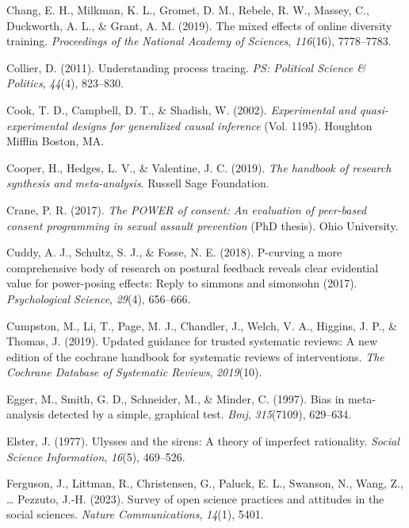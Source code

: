 \documentclass[
  ,jou]{apa6}
\newlength{\cslhangindent}
\newenvironment{CSLReferences}[2] %
 {\begin{list}{}{%
  \setlength{\itemindent}{0pt}
  \setlength{\leftmargin}{0pt}
  \setlength{\parsep}{0pt}
  \ifodd #1
   \setlength{\leftmargin}{\cslhangindent}
   \setlength{\itemindent}{-1\cslhangindent}
  \fi
  \setlength{\itemsep}{#2\baselineskip}}}
 {\end{list}}
\begin{document}
\begin{CSLReferences}{1}{0}
Chang, E. H., Milkman, K. L., Gromet, D. M., Rebele, R. W., Massey, C., Duckworth, A. L., \& Grant, A. M. (2019). The mixed effects of online diversity training. \emph{Proceedings of the National Academy of Sciences}, \emph{116}(16), 7778--7783.

Collier, D. (2011). Understanding process tracing. \emph{PS: Political Science \& Politics}, \emph{44}(4), 823--830.

Cook, T. D., Campbell, D. T., \& Shadish, W. (2002). \emph{Experimental and quasi-experimental designs for generalized causal inference} (Vol. 1195). Houghton Mifflin Boston, MA.

Cooper, H., Hedges, L. V., \& Valentine, J. C. (2019). \emph{The handbook of research synthesis and meta-analysis}. Russell Sage Foundation.

Crane, P. R. (2017). \emph{The POWER of consent: An evaluation of peer-based consent programming in sexual assault prevention} (PhD thesis). Ohio University.

Cuddy, A. J., Schultz, S. J., \& Fosse, N. E. (2018). P-curving a more comprehensive body of research on postural feedback reveals clear evidential value for power-posing effects: Reply to simmons and simonsohn (2017). \emph{Psychological Science}, \emph{29}(4), 656--666.

Cumpston, M., Li, T., Page, M. J., Chandler, J., Welch, V. A., Higgins, J. P., \& Thomas, J. (2019). Updated guidance for trusted systematic reviews: A new edition of the cochrane handbook for systematic reviews of interventions. \emph{The Cochrane Database of Systematic Reviews}, \emph{2019}(10).

Egger, M., Smith, G. D., Schneider, M., \& Minder, C. (1997). Bias in meta-analysis detected by a simple, graphical test. \emph{Bmj}, \emph{315}(7109), 629--634.

Elster, J. (1977). Ulysses and the sirens: A theory of imperfect rationality. \emph{Social Science Information}, \emph{16}(5), 469--526.

Ferguson, J., Littman, R., Christensen, G., Paluck, E. L., Swanson, N., Wang, Z., \ldots{} Pezzuto, J.-H. (2023). Survey of open science practices and attitudes in the social sciences. \emph{Nature Communications}, \emph{14}(1), 5401.


\end{CSLReferences}
\end{document}
